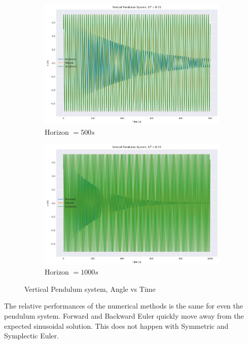 \documentclass[11pt]{article}
\begin{document}
\begin{figure}[H]
    \centering
    \begin{subfigure}[H]{0.49\linewidth}
        \includegraphics[width=\linewidth]{../vp6.png}
        \caption*{Horizon $ = 500s$}
    \end{subfigure}
    \begin{subfigure}[H]{0.49\linewidth}
        \includegraphics[width=\linewidth]{../vp7.png}
        \caption*{Horizon $ = 1000s$}
    \end{subfigure}
    \caption*{Vertical Pendulum system, Angle vs Time}
\end{figure}

The relative performances of the numerical methods is the same for even the pendulum system. Forward and Backward Euler quickly move away from 
the expected sinusoidal solution. This does not happen with Symmetric and Symplectic Euler.
\end{document}
